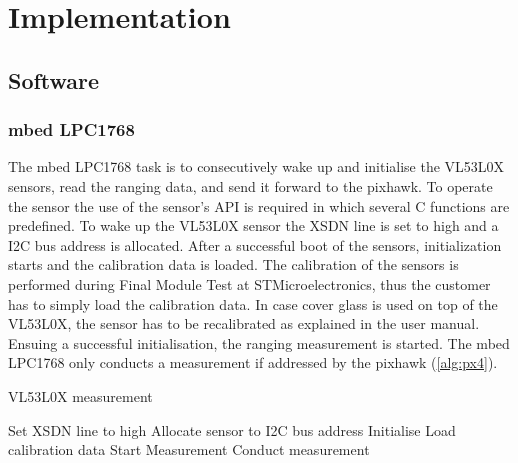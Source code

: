 \chapter{Implementation}
\label{ch:implementation}

\section{Software}
\subsection{mbed LPC1768}
\label{subs:mbed}
The mbed LPC1768 task is to consecutively wake up and initialise the VL53L0X sensors, read the ranging data, and send it forward to the pixhawk. To operate the sensor the use of the sensor's API is required in which several C functions are predefined. To wake up the VL53L0X sensor the XSDN line is set to high and a I2C bus address is allocated. After a successful boot of the sensors, initialization starts and the calibration data is loaded. The calibration of the sensors is performed during Final Module Test at STMicroelectronics, thus the customer has to simply load the calibration data. In case cover glass is used on top of the VL53L0X, the sensor has to be recalibrated as explained in the user manual. Ensuing a successful initialisation, the ranging measurement is started. The mbed LPC1768 only conducts a measurement if addressed by the pixhawk (\cref{alg:px4}). 

\begin{algorithm}
	\caption{VL53L0X measurement}\label{alg:px4}
	\begin{algorithmic}[1]
		\State Set XSDN line to high
		\State Allocate sensor to I2C bus address
		\EndFor
		\State Initialise 
		\State Load calibration data
		\EndFor
		\State Start Measurement
		\State Conduct measurement
		\EndIf
		\EndFor
		\EndProcedure
	\end{algorithmic}
\end{algorithm}

